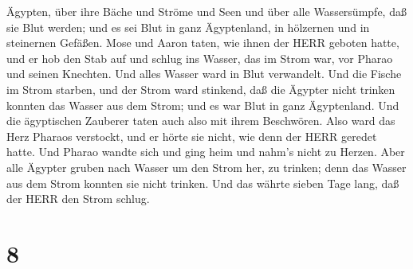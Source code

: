 Ägypten, über ihre Bäche und Ströme und Seen und über alle Wassersümpfe,
daß sie Blut werden; und es sei Blut in ganz Ägyptenland, in hölzernen
und in steinernen Gefäßen.  Mose und Aaron taten, wie ihnen
der HERR geboten hatte, und er hob den Stab auf und schlug ins Wasser,
das im Strom war, vor Pharao und seinen Knechten. Und alles Wasser ward
in Blut verwandelt.  Und die Fische im Strom starben, und
der Strom ward stinkend, daß die Ägypter nicht trinken konnten das
Wasser aus dem Strom; und es war Blut in ganz Ägyptenland. 
Und die ägyptischen Zauberer taten auch also mit ihrem Beschwören. Also
ward das Herz Pharaos verstockt, und er hörte sie nicht, wie denn der
HERR geredet hatte.  Und Pharao wandte sich und ging heim
und nahm's nicht zu Herzen.  Aber alle Ägypter gruben nach
Wasser um den Strom her, zu trinken; denn das Wasser aus dem Strom
konnten sie nicht trinken.  Und das währte sieben Tage
lang, daß der HERR den Strom schlug.

\hypertarget{section-7}{%
\section{8}\label{section-7}}

